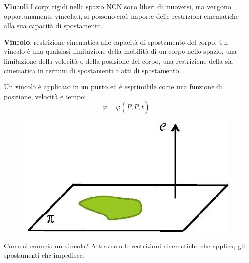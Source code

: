 \documentclass{article}
\begin{document}
\begin{adjustwidth}{2in}{}
\newpage
{\Large \textbf{Vincoli}} \mbox{} \newline
I corpi rigidi nello spazio NON sono liberi di muoversi, ma vengono opportunamente vincolati, si possono cioè imporre delle restrizioni cinematiche alla sua capacità di spostamento. \newline 

\textbf{Vincolo}: restrizione cinematica alle capacità di spostamento del corpo. \newline
Un vincolo è una qualsiasi limitazione della mobilità di un corpo nello spazio, una limitazione della velocità o della posizione del corpo, una restrizione della sia cinematica in termini di spostamenti o atti di spostamento.  \newline

Un vincolo è applicato in un punto ed è esprimibile come una funzione di posizione, velocità e tempo:
\[ \varphi = \varphi(P, \dot{P}, t)\]
\begin{figure}[H]
	\centering
	\includegraphics[width=0.25\linewidth]{"immagini/1.PARTE1_Pagina_26"}
\end{figure}
Come si enuncia un vincolo? Attraverso le restrizioni cinematiche che applica, gli spostamenti che impedisce. \newline 


\end{adjustwidth}
\end{document}
